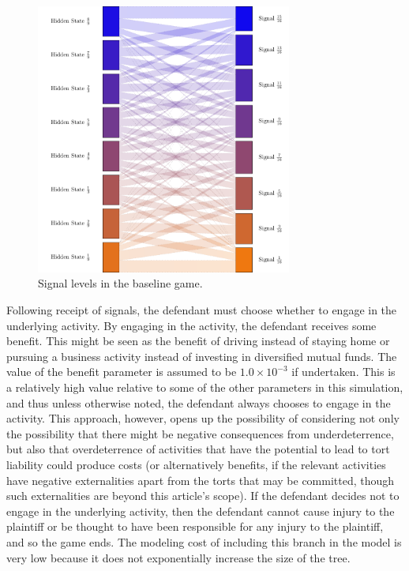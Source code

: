 \documentclass{article}
\begin{document}
\begin{figure}[t]
  \centering
  \includegraphics[width=0.75\textwidth,height=0.5\textheight]{../Figures/signals_levels.pdf}
  \caption{Signal levels in the baseline game.}
  \label{fig:signals_levels.pdf}
\end{figure}

Following receipt of signals, the defendant must choose whether to engage in the underlying activity. By engaging in the activity, the defendant receives some benefit. This might be seen as the benefit of driving instead of staying home or pursuing a business activity instead of investing in diversified mutual funds. The value of the benefit parameter is assumed to be $1.0 \times 10^{-3}$ if undertaken. This is a relatively high value relative to some of the other parameters in this simulation, and thus unless otherwise noted, the defendant always chooses to engage in the activity. This approach, however, opens up the possibility of considering not only the possibility that there might be negative consequences from underdeterrence, but also that overdeterrence of activities that have the potential to lead to tort liability could produce costs (or alternatively benefits, if the relevant activities have negative externalities apart from the torts that may be committed, though such externalities are beyond this article's scope). If the defendant decides not to engage in the underlying activity, then the defendant cannot cause injury to the plaintiff or be thought to have been responsible for any injury to the plaintiff, and so the game ends. The modeling cost of including this branch in the model is very low because it does not exponentially increase the size of the tree.
\end{document}
